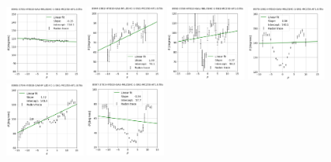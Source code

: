\documentclass[fleqn,usenatbib]{mnras}
\begin{document}
\begin{figure}
    \centering
    \includegraphics[width=0.23\textwidth]{Images/LINFITS/CPSB-8941-3701-LINFIT-EBARS-MASKED.png}
    \includegraphics[width=0.23\textwidth]{Images/LINFITS/CPSB-8944-1902-LINFIT-EBARS-MASKED.png}
    \includegraphics[width=0.23\textwidth]{Images/LINFITS/CPSB-8950-3704-LINFIT-EBARS-MASKED.png}
    \includegraphics[width=0.23\textwidth]{Images/LINFITS/CPSB-8979-1902-LINFIT-EBARS-MASKED.png}
    \includegraphics[width=0.23\textwidth]{Images/LINFITS/CPSB-8996-3704-LINFIT-EBARS-MASKED.png}
    \includegraphics[width=0.23\textwidth]{Images/LINFITS/CPSB-8997-3703-LINFIT-EBARS-MASKED.png}

\end{figure}
\end{document}
